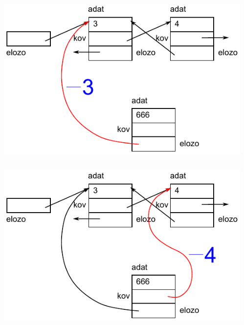 \begin{frame}
  \begin{columns}[c]
      \scriptsize
      \begin{exampleblock}{}
        \vspace{-.2cm}
        
        \vspace{-.2cm}
    \end{exampleblock}
      \includegraphics[width=\textwidth]{lista2/list2-3.pdf}
  \end{columns}
\end{frame}

\begin{frame}
  \begin{columns}[c]
      \scriptsize
      \begin{exampleblock}{}
        \vspace{-.2cm}
        
        \vspace{-.2cm}
    \end{exampleblock}
      \includegraphics[width=\textwidth]{lista2/list2-4.pdf}
  \end{columns}
\end{frame}

